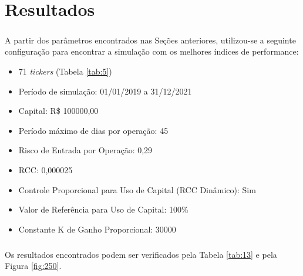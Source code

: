 \chapter{Resultados}
\label{cap4}



\paragraph{} A partir dos parâmetros encontrados nas Seções anteriores, utilizou-se a seguinte configuração para encontrar a simulação com os melhores índices de performance:

\begin{itemize}
    \item 71 \textit{tickers} (Tabela \ref{tab:5})
    \item Período de simulação: 01/01/2019 a 31/12/2021
    \item Capital: R\$ 100000,00
    \item Período máximo de dias por operação: 45
    \item Risco de Entrada por Operação: 0,29
    \item RCC: 0,000025
    \item Controle Proporcional para Uso de Capital (RCC Dinâmico): Sim
    \item Valor de Referência para Uso de Capital: 100\%
    \item Constante K de Ganho Proporcional: 30000
\end{itemize}

\paragraph{} Os resultados encontrados podem ser verificados pela Tabela \ref{tab:13} e pela Figura \ref{fig:250}.

